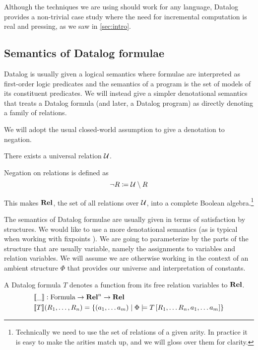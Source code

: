 Although the techniques we are using should work for any language, Datalog
provides a non-trivial case study where the need for incremental computation is
real and pressing, as we saw in \cref{sec:intro}.

\subsection{Semantics of Datalog formulae}

Datalog is usually given a logical semantics where formulae are interpreted as first-order
logic predicates and the semantics of a program is the set of models of its constituent
predicates. We will instead give a simpler denotational semantics that treats a Datalog
formula (and later, a Datalog program) as directly denoting a family of relations.

We will adopt the usual closed-world assumption to give a denotation to negation.

\begin{defn}
  There exists a universal relation $\mathcal{U}$.

  Negation on relations is defined as
  \begin{displaymath}
    \neg R \coloneqq \mathcal{U} \setminus R
  \end{displaymath}
\end{defn}

This makes $\mathbf{Rel}$, the set of all relations over $\mathcal{U}$, into a
complete Boolean
algebra.\footnote{Technically we need to use the set of relations of a given
  arity. In practice it is easy to make the arities match up, and we will gloss
  over them for clarity.}

The semantics of Datalog formulae are usually given in terms of satisfaction by
structures. We would like to use a more denotational semantics (as is typical
when working with fixpoints \autocite[see e.g.][]{compton1994stratified}). We are
going to parameterize by the parts of the structure that are usually variable,
namely the assignments to variables and relation variables. We will assume we
are otherwise working in the context of an ambient structure $\Phi$ that
provides our universe and interpretation of constants.

\begin{defn}
  A Datalog formula $T$ denotes a function from its free relation variables to
  $\mathbf{Rel}$.
  \begin{align*}
    &\llbracket \_ \rrbracket : \mathrm{Formula} \rightarrow \mathbf{Rel}^n \rightarrow \mathbf{Rel}\\
    &\llbracket T \rrbracket(R_1, \dots, R_n) = \left\{ \left(a_1, \dots a_m \right) \mid \Phi \models T\left[R_1, \dots R_n, a_1, \dots a_m \right] \right\}
  \end{align*}
\end{defn}

